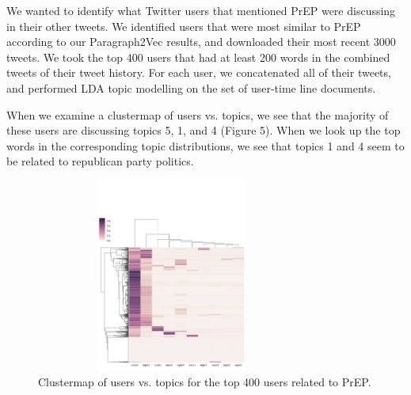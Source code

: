 \documentclass{sig-alternate-05-2015}
\begin{document}

We wanted to identify what Twitter users that mentioned PrEP were discussing in their other tweets. We identified users that were most similar to PrEP according to our Paragraph2Vec results, and downloaded their most recent 3000 tweets. We took the top 400 users that had at least 200 words in the combined tweets of their tweet history. For each user, we concatenated all of their tweets, and performed LDA topic modelling on the set of user-time line documents.

When we examine a clustermap of users vs. topics, we see that the majority of these users are discussing topics 5, 1, and 4 (Figure 5). When we look up the top words in the corresponding topic distributions, we see that topics 1 and 4 seem to be related to republican party politics.

\begin{figure}
\centering
\includegraphics[height=2.5in, width=3.5in]{user_timeline_clustermap}
\caption{Clustermap of users vs. topics for the top 400 users related to PrEP.}
\end{figure}
\end{document}
